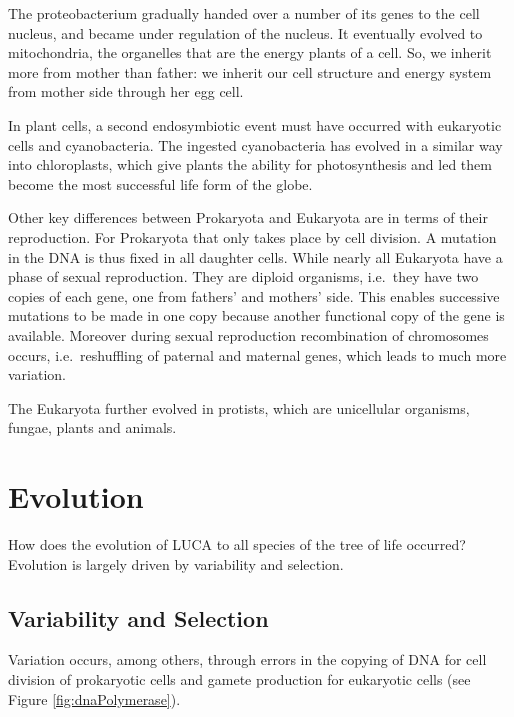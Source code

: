 \documentclass[
  11pt,
]{book}
\begin{document}
The proteobacterium gradually handed over a number of its genes to the cell nucleus, and became under regulation of the nucleus. It eventually evolved to mitochondria, the organelles that are the energy plants of a cell. So, we inherit more from mother than father: we inherit our cell structure and energy system from mother side through her egg cell.

In plant cells, a second endosymbiotic event must have occurred with eukaryotic cells and cyanobacteria. The ingested cyanobacteria has evolved in a similar way into chloroplasts, which give plants the ability for photosynthesis and led them become the most successful life form of the globe.

Other key differences between Prokaryota and Eukaryota are in terms of their reproduction.
For Prokaryota that only takes place by cell division. A mutation in the DNA is thus fixed in all daughter cells. While nearly all Eukaryota have a phase of sexual reproduction. They are diploid organisms, i.e.~they have two copies of each gene, one from fathers' and mothers' side. This enables successive mutations to be made in one copy because another functional copy of the gene is available. Moreover during sexual reproduction recombination of chromosomes occurs, i.e.~reshuffling of paternal and maternal genes, which leads to much more variation.

The Eukaryota further evolved in protists, which are unicellular organisms, fungae, plants and animals.

\newpage

\hypertarget{evolution}{%
\section{Evolution}\label{evolution}}

How does the evolution of LUCA to all species of the tree of life occurred?
Evolution is largely driven by variability and selection.

\hypertarget{variability-and-selection}{%
\subsection{Variability and Selection}\label{variability-and-selection}}

Variation occurs, among others, through errors in the copying of DNA for cell division of prokaryotic cells and gamete production for eukaryotic cells (see Figure \ref{fig:dnaPolymerase}).
\end{document}
